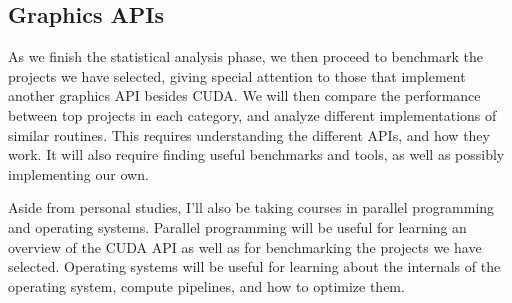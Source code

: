 \documentclass[11pt, conference, onecolumn, final]{IEEEtran}
\begin{document}
\subsection{Graphics APIs} \label{sec:next-steps-apis}

As we finish the statistical analysis phase, we then proceed to benchmark the
projects we have selected, giving special attention to those that implement
another graphics API besides CUDA. We will then compare the performance between
top projects in each category, and analyze different implementations of similar
routines.
This requires understanding the different APIs, and how they work.
It will also require finding useful benchmarks and tools, as well as
possibly implementing our own.

Aside from personal studies, I'll also be taking courses in parallel
programming and operating systems.
Parallel programming will be useful for learning an overview of the CUDA API
as well as for benchmarking the projects we have selected.
Operating systems will be useful for learning about the internals of the
operating system, compute pipelines, and how to optimize them.



\end{document}
